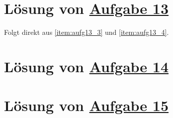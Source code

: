\section{Lösung von 
	\texorpdfstring{\hyperref[aufg:13]{Aufgabe 13}}{}
}\label{loes:13}





Folgt direkt aus \ref{item:aufg13_3} und \ref{item:aufg13_4}.

\section{Lösung von 
	\texorpdfstring{\hyperref[aufg:14]{Aufgabe 14}}{}
}\label{loes:14}

\section{Lösung von 
	\texorpdfstring{\hyperref[aufg:15]{Aufgabe 15}}{}
}\label{loes:15}
